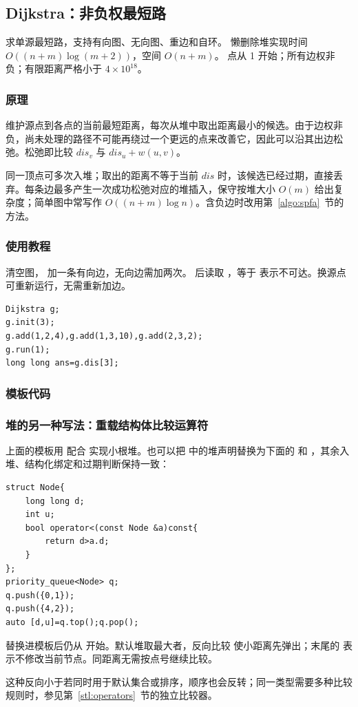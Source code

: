 \subsection{Dijkstra：非负权最短路}
\label{algo:dijkstra}
\AlgorithmInfo
    {求单源最短路，支持有向图、无向图、重边和自环。}
    {懒删除堆实现时间 $O((n+m)\log(m+2))$，空间 $O(n+m)$。}
    {点从 1 开始；所有边权非负；有限距离严格小于 $4\times10^{18}$。}

\subsubsection*{原理}
维护源点到各点的当前最短距离，每次从堆中取出距离最小的候选。由于边权非负，尚未处理的路径不可能再绕过一个更远的点来改善它，因此可以沿其出边松弛。松弛即比较 $dis_v$ 与 $dis_u+w(u,v)$。

同一顶点可多次入堆；取出的距离不等于当前 $dis$ 时，该候选已经过期，直接丢弃。每条边最多产生一次成功松弛对应的堆插入，保守按堆大小 $O(m)$ 给出复杂度；简单图中常写作 $O((n+m)\log n)$。含负边时改用第~\ref{algo:spfa}~节的方法。

\subsubsection*{使用教程}
 清空图， 加一条有向边，无向边需加两次。 后读取 ，等于  表示不可达。换源点可重新运行，无需重新加边。
\begin{lstlisting}[style=mtycpp,numbers=none]
Dijkstra g;
g.init(3);
g.add(1,2,4),g.add(1,3,10),g.add(2,3,2);
g.run(1);
long long ans=g.dis[3];
\end{lstlisting}

\subsubsection*{模板代码}

\subsubsection*{堆的另一种写法：重载结构体比较运算符}
上面的模板用  配合  实现小根堆。也可以把  中的堆声明替换为下面的  和 ，其余入堆、结构化绑定和过期判断保持一致：
\begin{lstlisting}[style=mtycpp,numbers=none]
struct Node{
	long long d;
	int u;
	bool operator<(const Node &a)const{
		return d>a.d;
	}
};
priority_queue<Node> q;
q.push({0,1});
q.push({4,2});
auto [d,u]=q.top();q.pop();
\end{lstlisting}
替换进模板后仍从  开始。默认堆取最大者，反向比较  使小距离先弹出；末尾的  表示不修改当前节点。同距离无需按点号继续比较。

这种反向小于若同时用于默认集合或排序，顺序也会反转；同一类型需要多种比较规则时，参见第~\ref{stl:operators}~节的独立比较器。
